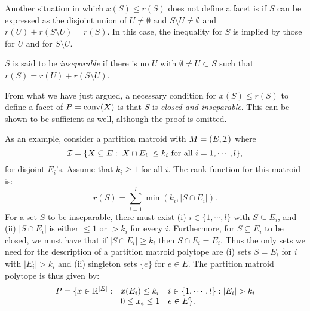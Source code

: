 \documentclass[12pt]{article}
\begin{document}
Another situation in which $x(S)\leq r(S)$ does not define a facet is
if $S$ can be expressed as the disjoint union of $U\neq \emptyset$ and
$S\setminus U \neq \emptyset$ and $r(U)+r(S\setminus U)=r(S)$. In
this case, the inequality for $S$ is implied by those for $U$ and for
$S\setminus U$. 
\begin{definition}
$S$ is said to be {\it inseparable} if there is no $U$ with $\emptyset
  \neq U \subset S$ such that $r(S)=r(U)+r(S\setminus U)$. 
\end{definition} 

From what we have just argued, a necessary condition for $x(S)\leq
r(S)$ to define a facet of $P=\operatorname{conv}(X)$ is that $S$ is {\it closed and
inseparable}. This can be shown to be sufficient as well, although the
proof is omitted. 

As an example, consider a partition matroid with $M=(E, {\cal I})$
where $${\cal I}=\{X\subseteq E: |X\cap E_i| \leq k_i \mbox{ for all }
i=1,\cdots,l\},$$ for disjoint $E_i$'s. Assume that $k_i\geq 1$ for
all $i$. The rank function for this matroid is:
$$r(S)=\sum_{i=1}^l \min(k_i, |S\cap E_i|).$$ For a set $S$ to be
inseparable, there must exist (i) $i\in\{1,\cdots, l\}$ with $S\subseteq
E_i$, and (ii) $|S\cap E_i|$ is either $\leq 1$ or $>k_i$ for every
$i$. Furthermore, for $S\subseteq E_i$ to be closed, we must have that
if $|S\cap E_i|\geq k_i$ then $S\cap E_i=E_i$. Thus the only sets we need
for the description of a partition matroid polytope are (i) sets
$S=E_i$ for $i$ with $|E_i|>k_i$ and (ii) singleton sets $\{e\}$ for
$e\in E$. The partition matroid polytope is thus given by:
$$\begin{array}{rll} 
P = \{x\in \R^{|E|}: & x(E_i) \leq k_i & i\in\{1,\cdots,l\}: |E_i|>k_i
\\
& 0\leq x_e \leq 1 & e\in E\}.
\end{array}$$
\end{document}
